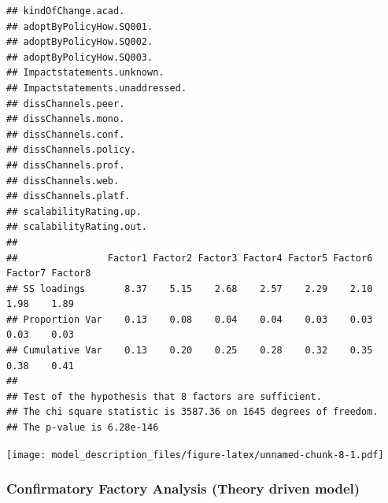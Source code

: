 \documentclass[
]{article}
\begin{document}
\begin{verbatim}
## kindOfChange.acad.                             
## adoptByPolicyHow.SQ001.                        
## adoptByPolicyHow.SQ002.                        
## adoptByPolicyHow.SQ003.                        
## Impactstatements.unknown.                      
## Impactstatements.unaddressed.                  
## dissChannels.peer.                             
## dissChannels.mono.                             
## dissChannels.conf.                             
## dissChannels.policy.                           
## dissChannels.prof.                             
## dissChannels.web.                              
## dissChannels.platf.                            
## scalabilityRating.up.                          
## scalabilityRating.out.                         
## 
##                Factor1 Factor2 Factor3 Factor4 Factor5 Factor6 Factor7 Factor8
## SS loadings       8.37    5.15    2.68    2.57    2.29    2.10    1.98    1.89
## Proportion Var    0.13    0.08    0.04    0.04    0.03    0.03    0.03    0.03
## Cumulative Var    0.13    0.20    0.25    0.28    0.32    0.35    0.38    0.41
## 
## Test of the hypothesis that 8 factors are sufficient.
## The chi square statistic is 3587.36 on 1645 degrees of freedom.
## The p-value is 6.28e-146
\end{verbatim}

\texttt{[image: model\_description\_files/figure-latex/unnamed-chunk-8-1.pdf]}

\hypertarget{confirmatory-factory-analysis-theory-driven-model}{%
\subsubsection{Confirmatory Factory Analysis (Theory driven
model)}\label{confirmatory-factory-analysis-theory-driven-model}}
\end{document}
